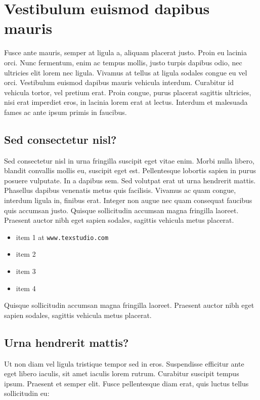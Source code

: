 \documentclass[8pt]{article}
\begin{document}
\newpage
\section{Vestibulum euismod dapibus mauris}

Fusce ante mauris, semper at ligula a, aliquam placerat justo. Proin eu lacinia orci. Nunc fermentum, enim ac tempus mollis, justo turpis dapibus odio, nec ultricies elit lorem nec ligula. Vivamus at tellus at ligula sodales congue eu vel orci. Vestibulum euismod dapibus mauris vehicula interdum. Curabitur id vehicula tortor, vel pretium erat. Proin congue, purus placerat sagittis ultricies, nisi erat imperdiet eros, in lacinia lorem erat at lectus. Interdum et malesuada fames ac ante ipsum primis in faucibus.


\subsection{Sed consectetur nisl?}
Sed consectetur nisl in urna fringilla suscipit eget vitae enim. Morbi nulla libero, blandit convallis mollis eu, suscipit eget est. Pellentesque lobortis sapien in purus posuere vulputate. In a dapibus sem. Sed volutpat erat ut urna hendrerit mattis. Phasellus dapibus venenatis metus quis facilisis. Vivamus ac quam congue, interdum ligula in, finibus erat. Integer non augue nec quam consequat faucibus quis accumsan justo. Quisque sollicitudin accumsan magna fringilla laoreet. Praesent auctor nibh eget sapien sodales, sagittis vehicula metus placerat.

\begin{itemize}
	\item item 1 at \texttt{www.texstudio.com}
	\item item 2
	\item item 3
	\item item 4
\end{itemize}
\vspace{5pt}

Quisque sollicitudin accumsan magna fringilla laoreet. Praesent auctor nibh eget sapien sodales, sagittis vehicula metus placerat.

\subsection{Urna hendrerit mattis?}

Ut non diam vel ligula tristique tempor sed in eros. Suspendisse efficitur ante eget libero iaculis, sit amet iaculis lorem rutrum. Curabitur suscipit tempus ipsum. Praesent et semper elit. Fusce pellentesque diam erat, quis luctus tellus sollicitudin eu:
\end{document}

